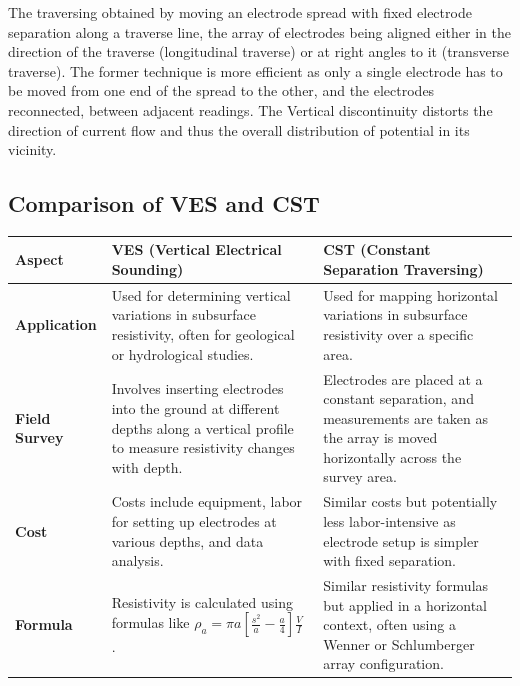 \documentclass[12pt,a4paper]{report}
\begin{document}
The traversing obtained by moving an electrode spread with fixed electrode
separation along a traverse line, the array of electrodes being aligned either in
the direction of the traverse (longitudinal traverse) or at right angles to it
(transverse traverse). The former technique is more efficient as only a single
electrode has to be moved from one end of the spread to the other, and the
electrodes reconnected, between adjacent readings. The Vertical discontinuity
distorts the direction of current flow and thus the overall distribution of
potential in its vicinity.

\subsection{Comparison of VES and CST}

\begin{tabular}{|>{\raggedright\arraybackslash}m{4cm}|>{\raggedright\arraybackslash}m{6cm}|>{\raggedright\arraybackslash}m{6cm}|}
    \hline
    \textbf{Aspect} & \textbf{VES (Vertical Electrical Sounding)} & \textbf{CST (Constant Separation Traversing)} \\ \hline
    
    \textbf{Application} & Used for determining vertical variations in subsurface resistivity, often for geological or hydrological studies. & Used for mapping horizontal variations in subsurface resistivity over a specific area. \\ \hline
    
    \textbf{Field Survey} & Involves inserting electrodes into the ground at different depths along a vertical profile to measure resistivity changes with depth. & Electrodes are placed at a constant separation, and measurements are taken as the array is moved horizontally across the survey area. \\ \hline
    
    \textbf{Cost} & Costs include equipment, labor for setting up electrodes at various depths, and data analysis. & Similar costs but potentially less labor-intensive as electrode setup is simpler with fixed separation. \\ \hline
    
    \textbf{Formula} & Resistivity is calculated using formulas like $\rho_a = \pi a \left[ \frac{s^2}{a} - \frac{a}{4} \right] \frac{V}{I}$ \cite{web:0}. & Similar resistivity formulas but applied in a horizontal context, often using a Wenner or Schlumberger array configuration. \\ \hline
    

\end{tabular}
\end{document}
